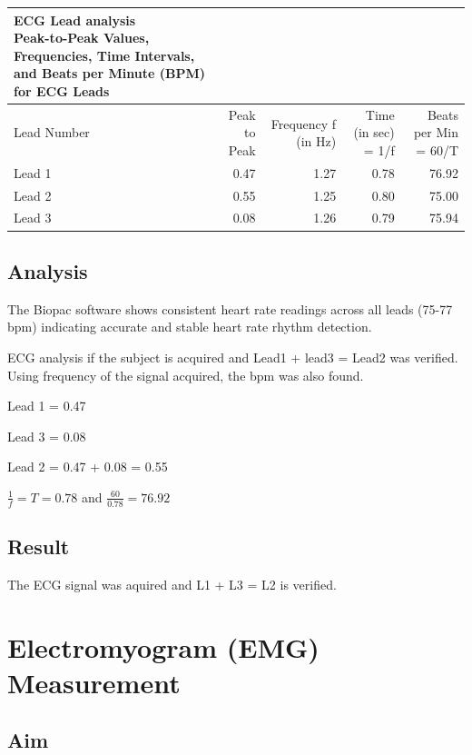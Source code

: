 \documentclass[
  11pt,
  letterpaper,
  DIV=11,
  numbers=noendperiod]{scrreprt}
\begin{document}
\begin{longtable*}{lrrrr}
\caption*{
{\large ECG Lead analysis} \\ 
{\small Peak-to-Peak Values, Frequencies, Time Intervals, and Beats per Minute (BPM) for ECG Leads}
} \\ 
\toprule
Lead Number & Peak to Peak & Frequency f (in Hz) & Time (in sec) = 1/f & Beats per Min = 60/T \\ 
\midrule\addlinespace[2.5pt]
Lead 1 & 0.47 & 1.27 & 0.78 & 76.92 \\ 
Lead 2 & 0.55 & 1.25 & 0.80 & 75.00 \\ 
Lead 3 & 0.08 & 1.26 & 0.79 & 75.94 \\ 
\bottomrule
\end{longtable*}

\section{Analysis}\label{analysis-1}

The Biopac software shows consistent heart rate readings across all
leads (75-77 bpm) indicating accurate and stable heart rate rhythm
detection.

ECG analysis if the subject is acquired and Lead1 + lead3 = Lead2 was
verified. Using frequency of the signal acquired, the bpm was also
found.

Lead 1 = 0.47

Lead 3 = 0.08

Lead 2 = 0.47 + 0.08 = 0.55

\(\frac{1}{f} = T = 0.78\) and \(\frac{60}{0.78} = 76.92\)

\section{Result}\label{result-1}

The ECG signal was aquired and L1 + L3 = L2 is verified.


\chapter{Electromyogram (EMG)
Measurement}\label{electromyogram-emg-measurement}

\section{Aim}\label{aim-2}
\end{document}
